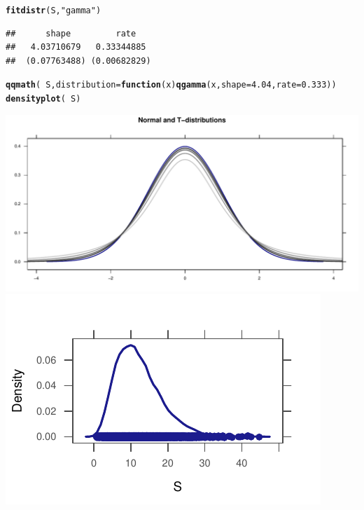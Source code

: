 \documentclass[twoside]{book}\usepackage[]{graphicx}\usepackage[]{xcolor}
\makeatletter
\def\maxwidth{ %
  \ifdim\Gin@nat@width>\linewidth
    \linewidth
  \else
    \Gin@nat@width
  \fi
}
\newcommand{\hlnum}[1]{\textcolor[rgb]{0.686,0.059,0.569}{#1}}%
\newcommand{\hlstr}[1]{\textcolor[rgb]{0.192,0.494,0.8}{#1}}%
\newcommand{\hlopt}[1]{\textcolor[rgb]{0,0,0}{#1}}%
\newcommand{\hlstd}[1]{\textcolor[rgb]{0.345,0.345,0.345}{#1}}%
\newcommand{\hlkwa}[1]{\textcolor[rgb]{0.161,0.373,0.58}{\textbf{#1}}}%
\newcommand{\hlkwc}[1]{\textcolor[rgb]{0.333,0.667,0.333}{#1}}%
\newcommand{\hlkwd}[1]{\textcolor[rgb]{0.737,0.353,0.396}{\textbf{#1}}}%
\newenvironment{kframe}{%
 \def\at@end@of@kframe{}%
 \ifinner\ifhmode%
  \def\at@end@of@kframe{\end{minipage}}%
  \begin{minipage}{\columnwidth}%
 \fi\fi%
 \def\FrameCommand##1{\hskip\@totalleftmargin \hskip-\fboxsep
 \colorbox{shadecolor}{##1}\hskip-\fboxsep
     \hskip-\linewidth \hskip-\@totalleftmargin \hskip\columnwidth}%
 \MakeFramed {\advance\hsize-\width
   \@totalleftmargin\z@ \linewidth\hsize
   \@setminipage}}%
 {\par\unskip\endMakeFramed%
 \at@end@of@kframe}
\newenvironment{knitrout}{}{} %
\makeatother
\begin{document}
\begin{solution}
\begin{knitrout}
{}



\end{knitrout}
\begin{knitrout}
\color{fgcolor}\begin{kframe}
\begin{alltt}
\hlkwd{fitdistr}\hlstd{(S,} \hlstr{"gamma"}\hlstd{)}
\end{alltt}
\begin{verbatim}
##      shape         rate   
##   4.03710679   0.33344885 
##  (0.07763488) (0.00682829)
\end{verbatim}
\begin{alltt}
\hlkwd{qqmath}\hlstd{(}\hlopt{~}\hlstd{S,} \hlkwc{distribution} \hlstd{=} \hlkwa{function}\hlstd{(}\hlkwc{x}\hlstd{)} \hlkwd{qgamma}\hlstd{(x,} \hlkwc{shape} \hlstd{=} \hlnum{4.04}\hlstd{,} \hlkwc{rate} \hlstd{=} \hlnum{0.333}\hlstd{))}
\hlkwd{densityplot}\hlstd{(}\hlopt{~}\hlstd{S)}
\end{alltt}
\end{kframe}

{\centering \includegraphics[width=\maxwidth]{figures/fig-unnamed-chunk-129-1} 
\includegraphics[width=\maxwidth]{figures/fig-unnamed-chunk-129-2} 

}
\end{knitrout}
\end{solution}
\end{document}
